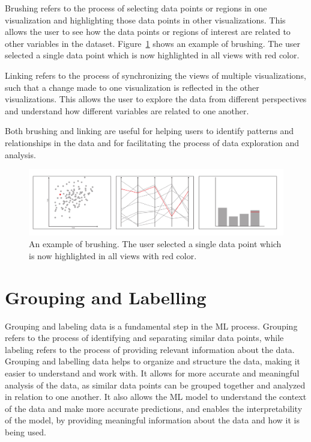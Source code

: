 Brushing refers to the process of selecting data points or regions in one
visualization and highlighting those data points in other visualizations.
This allows the user to see how the data points or regions of interest are
related to other variables in the dataset.
Figure~\ref{fig:BrushingDiagram} shows an example of brushing. The user
selected a single data point which is now highlighted in all views with
red color.

Linking refers to the process of synchronizing the views of multiple
visualizations, such that a change made to one visualization is
reflected in the other visualizations. This allows the user to explore
the data from different perspectives and understand how different
variables are related to one another.

Both brushing and linking are useful for helping users to identify
patterns and relationships in the data and for facilitating the
process of data exploration and analysis.

\begin{figure}[tp]
\centering
\includegraphics[frame,keepaspectratio,width=\linewidth,height=\halfh]
{diagrams/brushing.pdf}

\caption[Brushing]
{ An example of brushing. The user selected a single data point which
is now highlighted in all views with red color.
}
\label{fig:BrushingDiagram}
\end{figure}




\section{Grouping and Labelling}

Grouping and labeling data is a fundamental step in the ML process.
Grouping refers to the process of identifying and separating similar data
points, while labeling refers to the process of providing relevant
information about the data. Grouping and labelling data helps to organize
and structure the data, making it easier to understand and work with. It
allows for more accurate and meaningful analysis of the data, as similar
data points can be grouped together and analyzed in relation to one
another. It also allows the ML model to understand the context of the data
and make more accurate predictions, and enables the interpretability of
the model, by providing meaningful information about the data and how it
is being used.

